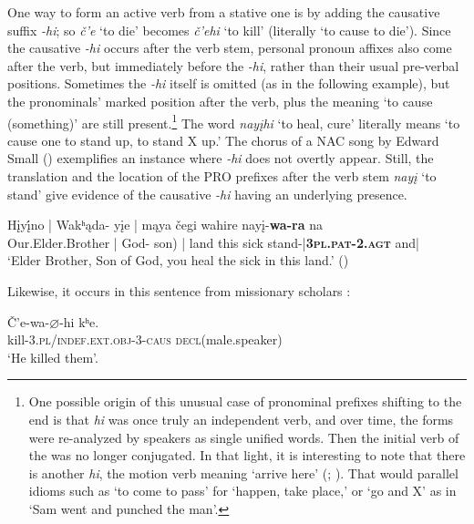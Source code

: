 \documentclass[output=paper]{LSP/langsci}
\begin{document}
One way to form an active verb from a stative one is by adding the causative suffix \textit{-hi}; so \textit{\v{c}'e} `to die' becomes \textit{\v{c}'ehi} `to kill' (literally `to cause to die'). Since the causative \textit{-hi} occurs after the verb stem, personal pronoun affixes also come after the verb, but immediately before the \textit{-hi}, rather than their usual pre-verbal positions.  Sometimes the \textit{-hi} itself is omitted (as in the following example), but the pronominals' marked position after the verb, plus the meaning `to cause (something)' are still present.\footnote{One possible origin of this unusual case of pronominal prefixes shifting to the end is that \textit{hi} was once truly an independent verb, and over time, the forms were re-analyzed by speakers as single unified words. Then the initial verb of the  was no longer conjugated. In that light, it is interesting to note that there is another \textit{hi}, the motion verb meaning `arrive here' (\citealt{Taylor1976a}; \citealt{Hopkins1988}). That would parallel  idioms such as `to come to pass' for `happen, take place,' or `go and X' as in `Sam went and punched the man'.}  The word \textit{nay\k{i}hi}  `to heal, cure' literally means `to cause one to stand up, to stand X up.'  The chorus of a NAC song by Edward Small () exemplifies an instance where  \textit{-hi} does not overtly appear.  Still, the translation and the location of the PRO prefixes after the verb stem \textit{nay\k{i}} `to stand' give evidence of the causative \textit{-hi} having an underlying presence.

\begin{exe}
\ex \gll H\k{i}y\k{\'i}no | Wakʰ\k{a}da- y\k{i}e   | m\k{a}ya  \v{c}egi  wahire nay\k{i}-\textbf{wa-ra} na \\
Our.Elder.Brother | God- son)    | land   this   sick      stand-|\textbf{\textsc{3pl.pat-2.agt}} and|\\
\trans `Elder Brother, Son of God, you heal the sick in this land.' (\citealt{Davidson1997})
 \end{exe}

Likewise, it occurs in this sentence from missionary scholars \citet[43: \#53]{HamiltonIrvin1848}:
\begin{exe}
\ex \gll \v{C}'e-wa-{\ob}$\varnothing${\cb}-hi       kʰe. \\
   	kill-3.\textsc{pl/indef.ext.obj}-3-\textsc{caus} \textsc{decl}(male.speaker)  \\
\trans `He killed them'.	
\end{exe}
\end{document}
